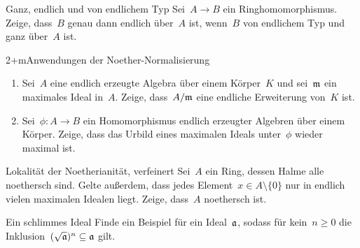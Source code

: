 \documentclass{uebblatt}
\begin{document}

\begin{aufgabe}{2}{Ganz, endlich und von endlichem Typ}
Sei~$A \to B$ ein Ringhomomorphismus. Zeige, dass~$B$ genau dann endlich
über~$A$ ist, wenn~$B$ von endlichem Typ und ganz über~$A$ ist.
\end{aufgabe}

\begin{aufgabe}{2+m}{Anwendungen der Noether-Normalisierung}
\begin{enumerate}
\item Sei~$A$ eine endlich erzeugte Algebra über einem Körper~$K$ und
sei~$\mathfrak{m}$ ein maximales Ideal in~$A$. Zeige, dass~$A/\mathfrak{m}$ eine endliche
Erweiterung von~$K$ ist.
\item Sei~$\phi : A \to B$ ein Homomorphismus endlich erzeugter Algebren über
einem Körper. Zeige, dass das Urbild eines maximalen Ideals unter~$\phi$ wieder
maximal ist.
\end{enumerate}
\end{aufgabe}

\begin{aufgabe}{2}{Lokalität der Noetherianität, verfeinert}
Sei~$A$ ein Ring, dessen Halme alle noethersch sind. Gelte außerdem, dass
jedes Element~$x \in A \setminus \{0\}$ nur in endlich vielen maximalen Idealen
liegt. Zeige, dass~$A$ noethersch ist.
\end{aufgabe}

\begin{aufgabe}{2}{Ein schlimmes Ideal}
Finde ein Beispiel für ein Ideal~$\mathfrak{a}$, sodass für kein~$n \geq 0$
die Inklusion~$(\sqrt{\mathfrak{a}})^n \subseteq \mathfrak{a}$ gilt.
\end{aufgabe}
\end{document}
